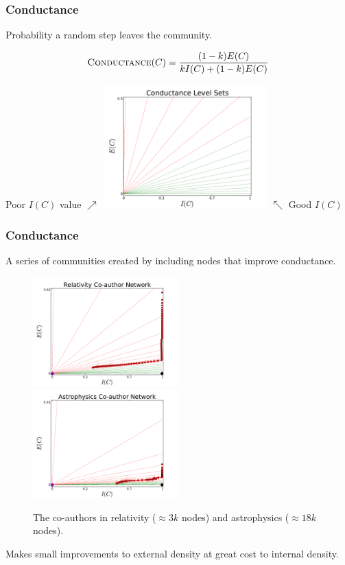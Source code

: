 \documentclass{beamer}
\begin{document}
\begin{frame}\frametitle{Conductance}
Probability a random step leaves the community.
\begin{block}{}
\begin{center}
\begin{equation}
\mbox{\sc Conductance}(C) = \frac{(1 - k)E(C)}{kI(C) + (1 - k)E(C)} \nonumber
\end{equation}
\end{center}
\end{block}
Poor $I(C)$ value $\nearrow$ \includegraphics[width=2.5in]{Figures/cond_ls} $\nwarrow$ Good $I(C)$

\end{frame}



\begin{frame}\frametitle{Conductance}
A series of communities created by including nodes that improve conductance.

\begin{figure}
\includegraphics[width=2.2in]{Figures/conductance_relativity}
\includegraphics[width=2.2in]{Figures/conductance_astro}
\caption{The co-authors in relativity ($\approx 3k$ nodes) and astrophysics ($\approx 18k$ nodes).}
\end{figure}
Makes small improvements to external density at great cost to internal density.
\end{frame}
\end{document}
